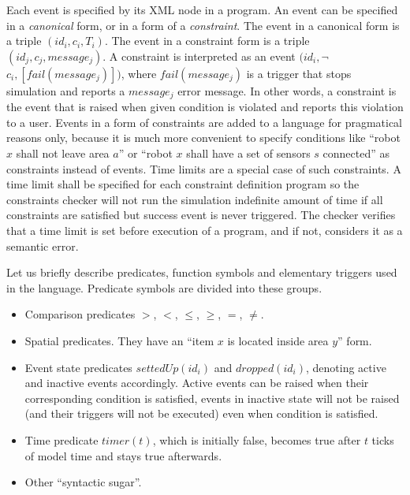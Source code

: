 \documentclass[conference]{IEEEtran}
\begin{document}
Each event is specified by its XML node in a program. An event can be specified in a \textit{canonical} form, or in a form of a \textit{constraint}. The event in a canonical form is a triple $(id_i, c_i, T_i)$. The event in a constraint form is a triple $(id_j, c_j, message_j)$. A constraint is interpreted as an event $(id_i, $$\neg$$c_i, [ fail(message_j) ])$, where $fail(message_j)$ is a trigger that stops simulation and reports a $message_j$ error message. In other words, a constraint is the event that is raised when given condition is violated and reports this violation to a user. Events in a form of constraints are added to a language for pragmatical reasons only, because it is much more convenient to specify conditions like ``robot $x$ shall not leave area $a$'' or ``robot $x$ shall have a set of sensors $s$ connected'' as constraints instead of events. Time limits are a special case of such constraints. A time limit shall be specified for each constraint definition program so the constraints checker will not run the simulation indefinite amount of time if all constraints are satisfied but success event is never triggered. The checker verifies that a time limit is set before execution of a program, and if not, considers it as a semantic error.

Let us briefly describe predicates, function symbols and elementary triggers used in the language. Predicate symbols are divided into these groups.
\begin{itemize}
    \item Comparison predicates $>$, $<$, $\leq$, $\geq$, $=$, $\neq$.
    \item Spatial predicates. They have an ``item $x$ is located inside area $y$'' form.
    \item Event state predicates $settedUp(id_i)$ and $dropped(id_i)$, denoting active and inactive events accordingly. Active events can be raised when their corresponding condition is satisfied, events in inactive state will not be raised (and their triggers will not be executed) even when condition is satisfied.
    \item Time predicate $timer(t)$, which is initially false, becomes true after $t$ ticks of model time and stays true afterwards.
    \item Other ``syntactic sugar''.
\end{itemize}
\end{document}
